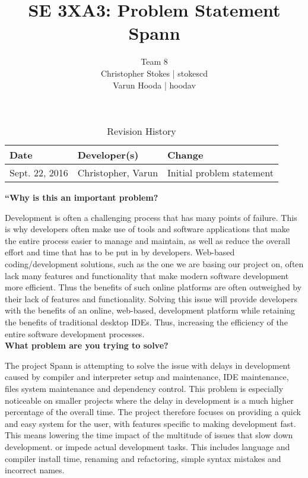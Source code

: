 \documentclass{article}
\title{SE 3XA3: Problem Statement\\Spann}
\author{Team 8
		\\ Christopher Stokes | stokescd
		\\ Varun Hooda | hoodav
}
\date{}
\begin{document}
\begin{table}[hp]
\caption{Revision History} \label{TblRevisionHistory}
\begin{tabularx}{\textwidth}{llX}
\toprule
\textbf{Date} & \textbf{Developer(s)} & \textbf{Change}\\
\midrule
    Sept. 22, 2016 & Christopher, Varun & Initial problem statement\\
\bottomrule
\end{tabularx}
\end{table}

\newpage

\maketitle

\large
\textbf{“Why is this an important problem?}\\
\normalsize

Development is often a challenging process that has many points of failure.
This is why developers often make use of tools and software applications that
make the entire process easier to manage and maintain, as well as reduce the
overall effort and time that has to be put in by developers. Web-based
coding/development solutions, such as the one we are basing our project on,
often lack many features and functionality that make modern software
development more efficient. Thus the benefits of such online platforms are
often outweighed by their lack of features and functionality. Solving this
issue will provide developers with the benefits of an online, web-based,
development platform while retaining the benefits of traditional desktop IDEs.
Thus, increasing the efficiency of the entire software development processes.\\

\large
\textbf{What problem are you trying to solve?}\\
\normalsize

The project Spann is attempting to solve the issue with delays in development
caused by compiler and interpreter setup and maintenance,  IDE maintenance,
files system maintenance and dependency control. This problem is especially
noticeable on smaller projects where the delay in development is a much higher
percentage of the overall time. The project therefore focuses on providing a
quick and easy system for the user, with features specific to making
development fast. This means lowering the time impact of the multitude of
issues that slow down development. or impede actual development tasks. This
includes language and compiler install time, renaming and refactoring, simple
syntax mistakes and incorrect names.\\
\end{document}
